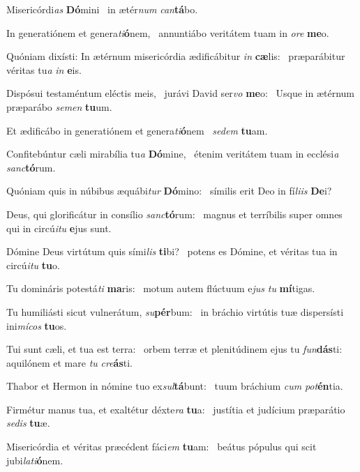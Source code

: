 \item Misericórdi\textit{as} \textbf{Dó}mini~\psstar{} in ætér\textit{num} \textit{can}\textbf{tá}bo.
\item In generatiónem et genera\textit{ti}\textbf{ó}\-nem,~\psstar{} annuntiábo veritátem tuam in \textit{ore} \textbf{me}o.
\item Quóniam dixísti: In ætérnum misericórdia ædificábitur \textit{in} \textbf{cæ}lis:~\psstar{} præparábitur véritas tu\textit{a} \textit{in} \textbf{e}is.
\item Dispósui testaméntum eléctis meis,~\pscross{} jurávi David ser\textit{vo} \textbf{me}o:~\psstar{} Usque in ætérnum præparábo \textit{semen} \textbf{tu}um.
\item Et ædificábo in generatiónem et genera\textit{ti}\textbf{ó}nem~\psstar{} \textit{sedem} \textbf{tu}am.
\item Confitebúntur cæli mirabília tu\textit{a} \textbf{Dó}mine,~\psstar{} étenim veritátem tuam in ecclési\textit{a} \textit{sanc}\textbf{tó}rum.
\item Quóniam quis in núbibus æquábi\textit{tur} \textbf{Dó}mino:~\psstar{} símilis erit Deo in fí\textit{liis} \textbf{De}i?
\item Deus, qui glorificátur in consílio \textit{sanc}\textbf{tó}rum:~\psstar{} magnus et terríbilis super omnes qui in circú\textit{itu} \textbf{e}jus sunt.
\item Dómine Deus virtútum quis sími\textit{lis} \textbf{ti}bi?~\psstar{} potens es Dómine, et véritas tua in circú\textit{itu} \textbf{tu}o.
\item Tu domináris potestá\textit{ti} \textbf{ma}ris:~\psstar{} motum autem flúctuum e\textit{jus} \textit{tu} \textbf{mí}tigas.
\item Tu humiliásti sicut vulnerá\-tum, \textit{su}\textbf{pér}bum:~\psstar{} in bráchio virtútis tuæ dispersísti ini\textit{mícos} \textbf{tu}os.
\item Tui sunt cæli, et tua est terra:~\pscross{} orbem terræ et plenitúdinem ejus tu \textit{fun}\textbf{dás}ti:~\psstar{} aquilónem et mare \textit{tu} \textit{cre}\textbf{ás}ti.
\item Thabor et Hermon in nómine tuo ex\textit{sul}\textbf{tá}bunt:~\psstar{} tuum bráchium \textit{cum} \textit{pot}\textbf{én}tia.
\item Firmétur manus tua, et exaltétur déxte\textit{ra} \textbf{tu}a:~\psstar{} justítia et judícium præparátio \textit{sedis} \textbf{tu}æ.
\item Misericórdia et véritas præcédent fáci\textit{em} \textbf{tu}am:~\psstar{} beátus pópulus qui scit jubi\textit{lati}\textbf{ó}nem.
